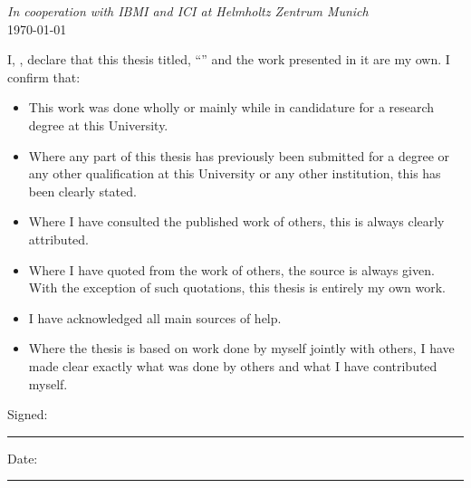 \documentclass[
11pt, %
english, %
singlespacing, %
headsepline, %
]{MastersDoctoralThesis} %
\begin{document}
\begin{titlepage}
\begin{center}
\vfill

\large \textit{In cooperation with IBMI and ICI at Helmholtz Zentrum Munich}\\[0.1cm] %
{\large \today}\\[4cm] %
 
\vfill
\end{center}
\end{titlepage}


\begin{declaration}
\addchaptertocentry{\authorshipname} %
\noindent I, \authorname, declare that this thesis titled, \enquote{\ttitle} and the work presented in it are my own. I confirm that:

\begin{itemize} 
\item This work was done wholly or mainly while in candidature for a research degree at this University.
\item Where any part of this thesis has previously been submitted for a degree or any other qualification at this University or any other institution, this has been clearly stated.
\item Where I have consulted the published work of others, this is always clearly attributed.
\item Where I have quoted from the work of others, the source is always given. With the exception of such quotations, this thesis is entirely my own work.
\item I have acknowledged all main sources of help.
\item Where the thesis is based on work done by myself jointly with others, I have made clear exactly what was done by others and what I have contributed myself.\\
\end{itemize}
 
\noindent Signed:\\
\rule[0.5em]{25em}{0.5pt} %
 
\noindent Date:\\
\rule[0.5em]{25em}{0.5pt} %
\end{declaration}
\end{document}
